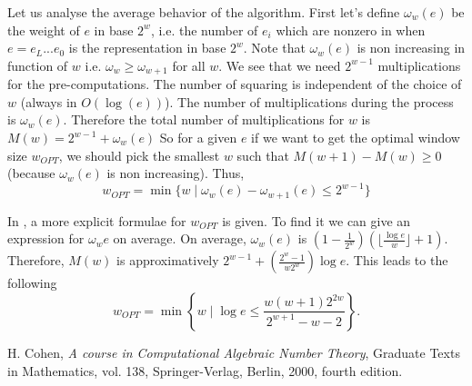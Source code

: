 \documentclass[12pt,a4paper]{article}
\begin{document}
    Let us analyse the average behavior of the algorithm. First let's define $\omega_w(e)$ be the weight of $e$ in base $2^w$, i.e. the number of $e_i$ which are nonzero in 
    when $e = e_L...e_0$ is the representation in base $2^w$. Note that $\omega_w(e)$ is non increasing in function of $w$ i.e. $\omega_w \geq \omega_{w+1}$ for all $w$.
    We see that we need $2^{w-1}$ multiplications for the pre-computations. The number of squaring is independent of the choice of $w$ (always in $O(\log(e))$).
    The number of multiplications during the process is $\omega_{w}(e)$. Therefore the total number of multiplications for $w$ is $M(w) = 2^{w-1} + \omega_w(e)$
    So for a given $e$ if we want to get the optimal window size $w_{OPT}$, we should pick the smallest $w$ such that $M(w+1) - M(w) \geq 0$ (because $\omega_w(e)$ is non increasing). 
    Thus,
    \[
        w_{OPT} = \min\{w \mid \omega_{w}(e) - \omega_{w+1}(e)  \leq 2^{w-1}\}
    \]
    
    In \cite[p.~10-11]{cohen}, a more explicit formulae for $w_{OPT}$ is given. To find it we can give an expression for $\omega_w{e}$ on average.
    On average, $\omega_w(e)$ is $(1 - \frac 1 {2^w})(\lfloor \frac{\log e}{w}\rfloor + 1)$.
    Therefore, $M(w)$ is approximatively $2^{w-1} + (\frac{2^w - 1}{w2^w})\log e$. This leads to the following
    \[
        w_{OPT} = \min\left\{w \mid \log e \leq \frac{w(w+1)2^{2w}}{2^{w+1} -w -2}\right\}.
    \]

    \begin{thebibliography}{9}
        H. Cohen,
        \emph{ A course in Computational Algebraic Number Theory},
        Graduate Texts in Mathematics, vol. 138, Springer-Verlag, Berlin, 2000, fourth edition.
    \end{thebibliography}
\end{document}
